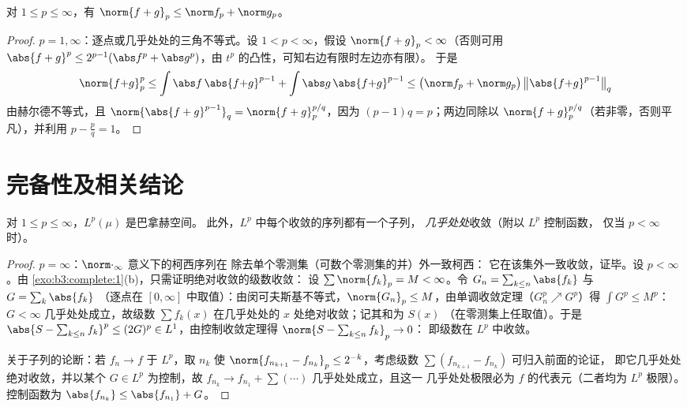 \begin{theorem}[闵可夫斯基不等式]\label{thm:b3:lp:minkowski}
对 $1 \leq p \leq \infty$，有 $\norm{f + g}_p \leq \norm f_p +
\norm g_p$。
\end{theorem}

\begin{proof}
$p = 1, \infty$：逐点或几乎处处的三角不等式。设 $1 <
p < \infty$，假设 $\norm{f+g}_p < \infty$（否则可用
$\abs{f+g}^p \leq 2^{p-1}(\abs f^p + \abs g^p)$，由
$t^p$ 的凸性，可知右边有限时左边亦有限）。
于是
\[
\norm{f{+}g}_p^p \leq \int\abs f\,\abs{f{+}g}^{p-1} +
\int\abs g\,\abs{f{+}g}^{p-1}
\leq \bigl(\norm f_p + \norm g_p\bigr)\,
\bigl\|\abs{f{+}g}^{p-1}\bigr\|_q
\]
由赫尔德不等式，且 $\norm{\abs{f+g}^{p-1}}_q =
\norm{f+g}_p^{p/q}$，因为 $(p-1)q = p$；两边同除以
$\norm{f+g}_p^{p/q}$（若非零，否则平凡），并利用 $p -
\frac pq = 1$。
\end{proof}

\section{完备性及相关结论}

\begin{theorem}[里斯–费舍尔]\label{thm:b3:lp:complete}
对 $1 \leq p \leq \infty$，$L^p(\mu)$ 是巴拿赫空间。
此外，$L^p$ 中每个收敛的序列都有一个子列，
\emph{几乎处处}收敛（附以 $L^p$ 控制函数，
仅当 $p < \infty$ 时）。
\end{theorem}

\begin{proof}
$p = \infty$：$\norm\cdot_\infty$ 意义下的柯西序列在
除去单个零测集（可数个零测集的并）外一致柯西：
它在该集外一致收敛，证毕。设 $p < \infty$。由
\cref{exo:b3:complete:1}(b)，只需证明绝对收敛的级数收敛：
设 $\sum\norm{f_k}_p = M < \infty$。令
$G_n = \sum_{k \leq n}\abs{f_k}$ 与 $G = \sum_k\abs{f_k}$
（逐点在 $[0,\infty]$ 中取值）：由闵可夫斯基不等式，$\norm{G_n}_p \leq
M$，由单调收敛定理（$G_n^p \nearrow G^p$）得 $\int G^p \leq M^p$：
$G < \infty$ 几乎处处成立，故级数 $\sum f_k(x)$
在几乎处处的 $x$ 处绝对收敛；记其和为 $S(x)$
（在零测集上任取值）。于是 $\abs{S - \sum_{k\leq n}f_k}^p \leq (2G)^p
\in L^1$，由控制收敛定理得 $\norm{S - \sum_{k\leq n}f_k}_p \to 0$：
即级数在 $L^p$ 中收敛。

关于子列的论断：若 $f_n \to f$ 于 $L^p$，取 $n_k$
使 $\norm{f_{n_{k+1}} - f_{n_k}}_p \leq 2^{-k}$，考虑级数
$\sum(f_{n_{k+1}} - f_{n_k})$ 可归入前面的论证，
即它几乎处处绝对收敛，并以某个 $G \in
L^p$ 为控制，故 $f_{n_k} \to f_{n_1} + \sum(\cdots)$ 几乎处处成立，且这一
几乎处处极限必为 $f$ 的代表元（二者均为 $L^p$
极限）。控制函数为 $\abs{f_{n_k}} \leq \abs{f_{n_1}} + G$。
\end{proof}

